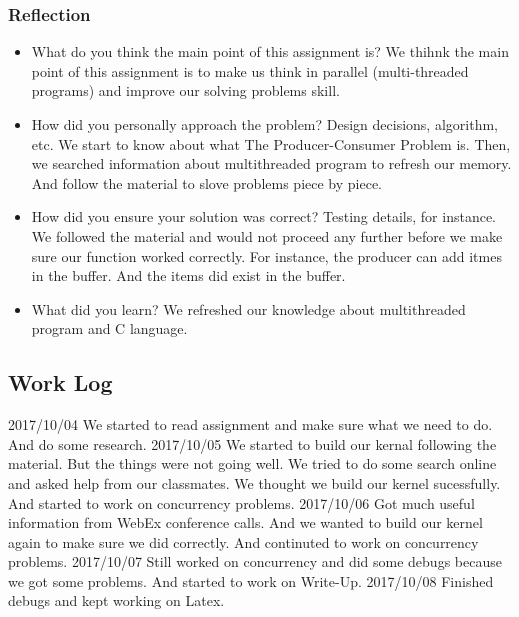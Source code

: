 \documentclass[letterpaper,10pt,draftclsnofoot,onecolumn]{IEEEtran}
\begin{document}
\subsubsection*{Reflection}
\begin{itemize}
\item What do you think the main point of this assignment is?
       We thihnk the main point of this assignment is to make us think in parallel (multi-threaded programs) and improve our solving problems skill.
\item How did you personally approach the problem? Design decisions, algorithm, etc.
       We start to know about what The Producer-Consumer Problem is. Then, we searched information about multithreaded program to refresh our memory. And follow the material to slove problems piece by piece.   
\item How did you ensure your solution was correct? Testing details, for instance.
      We followed the material and would not proceed any further before we make sure our function worked correctly. For instance, the producer can add itmes in the buffer. And the items did exist in the buffer.
\item What did you learn?
	   We refreshed our knowledge about multithreaded program and C language.
\end{itemize}
\subsection*{Work Log}
2017/10/04       We started to read assignment and make sure what we need to do. And do some research.
2017/10/05       We started to build our kernal following the material. But the things were not going well. We tried to do some search online and asked help from our classmates. We thought we build our kernel sucessfully. And started to work on concurrency problems.
2017/10/06       Got much useful information from WebEx conference calls. And we wanted to build our kernel again to make sure we did correctly. And continuted to work on concurrency problems.
2017/10/07       Still worked on concurrency and did some debugs because we got some problems. And started to work on Write-Up.
2017/10/08       Finished debugs and kept working on Latex. 
%
\end{document}
